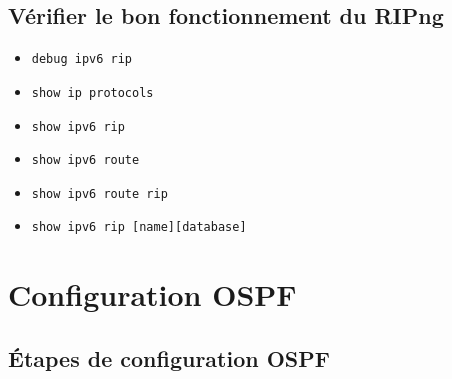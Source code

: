 \documentclass[a4paper]{article}
\begin{document}
\subsection{Vérifier le bon fonctionnement du RIPng}



\begin{itemize}[label=\textbf{–}]
    \item \texttt{debug ipv6 rip}
    \item \texttt{show ip protocols}
    \item \texttt{show ipv6 rip}
    \item \texttt{show ipv6 route}
    \item \texttt{show ipv6 route rip}
    \item \texttt{show ipv6 rip [name][database]}
\end{itemize}










\section{Configuration OSPF}





\subsection{Étapes de configuration OSPF}
\end{document}
